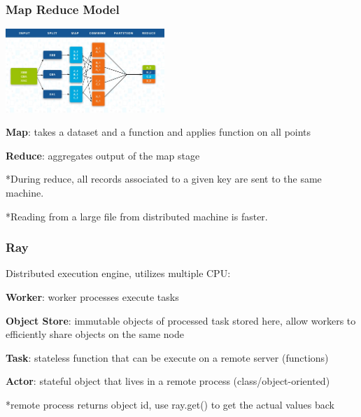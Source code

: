\documentclass[8pt]{extarticle}
\begin{document}
\subsubsection*{Map Reduce Model}
\begin{center}\includegraphics[width=0.45\textwidth]{mapreduce}\par \end{center}

\textbf{Map}: takes a dataset and a function and applies function on all points \par
\textbf{Reduce}: aggregates output of the map stage \par
*During reduce, all records associated to a given key are sent to the same machine.\par
*Reading from a large file from distributed machine is faster. \par

\subsubsection*{Ray}
Distributed execution engine, utilizes multiple CPU:\par
\textbf{Worker}: worker processes execute tasks \par
\textbf{Object Store}: immutable objects of processed task stored here, allow workers to efficiently share objects on the same node \par
\textbf{Task}: stateless function that can be execute on a remote server (functions) \par
\textbf{Actor}: stateful object that lives in a remote process (class/object-oriented) \par
*remote process returns object id, use ray.get() to get the actual values back \\
\hline
\end{document}
